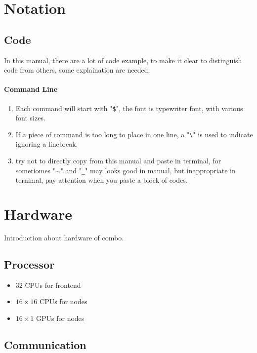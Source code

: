 \section{Notation}
\subsection{Code}
In this manual, there are a lot of code example, to make it clear to distinguish code from others, some explaination are needed:
\paragraph{Command Line}
\begin{enumerate}
\item Each command will start with "{\tt \$}", the font is typewriter font, with various font sizes.
\item If a piece of command is too long to place in one line, a "{\tt \textbackslash}" is used to indicate ignoring a linebreak.
\item try not to directly copy from this manual and paste in terminal, for sometiomes "{\tt $\sim$}" and "{\tt \_}" may looks good in manual, but inappropriate in ternimal, pay attention when you paste a block of codes.
\end{enumerate}




\section{Hardware}

Introduction about hardware of combo.

\subsection{Processor}

\begin{itemize}
\item $32$ CPUs for frontend
\item $16 \times 16$ CPUs for nodes
\item $16 \times 1$ GPUs for nodes
\end{itemize}

\subsection{Communication}

